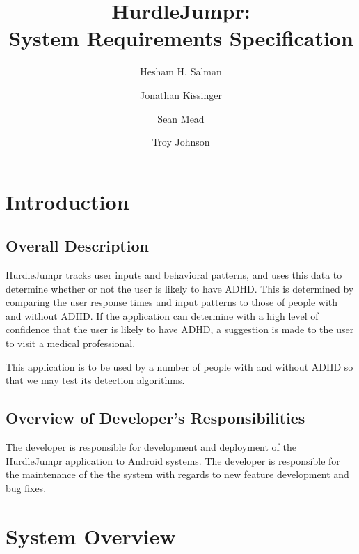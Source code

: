 \documentclass[a4wide]{article}
\title{HurdleJumpr:\\ System Requirements Specification}
\author{Hesham H. Salman \and Jonathan Kissinger \and Sean Mead
\and Troy Johnson}
\begin{document}
\maketitle

\section{Introduction}

\subsection{Overall Description}

HurdleJumpr tracks user inputs and behavioral patterns, and uses this data to
determine whether or not the user is likely to have ADHD. This is determined by
comparing the user response times and input patterns to those of people with and
without ADHD. If the application can determine with a high level of confidence
that the user is likely to have ADHD, a suggestion is made to the user to visit
a medical professional. \par
This application is to be used by a number of people with and without ADHD so
that we may test its detection algorithms.

%
%
%

\subsection{Overview of Developer's Responsibilities}

The developer is responsible for development and deployment of the HurdleJumpr
application to Android systems. The developer is responsible for the maintenance
of the the system with regards to new feature development and bug fixes.


\section{System Overview}
\end{document}
